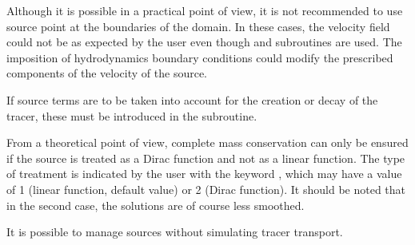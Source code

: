 Although it is possible in a practical point of view, it is not recommended
to use source point at the boundaries of the domain. In these cases, the
velocity field could not be as expected by the user even though
 and  subroutines are used.
The imposition of hydrodynamics
boundary conditions could modify the prescribed components of the velocity of
the source.

If source terms are to be taken into account for the creation or decay of the
tracer, these must be introduced in the  subroutine.

From a theoretical point of view, complete mass conservation can only be
ensured if the source is treated as a Dirac function and not as a linear
function. The type of treatment is indicated by the user with the keyword
, which may have a value of 1 (linear function, default
value) or 2 (Dirac function). It should be noted that in the second case, the
solutions are of course less smoothed.

It is possible to manage sources without simulating tracer transport.
